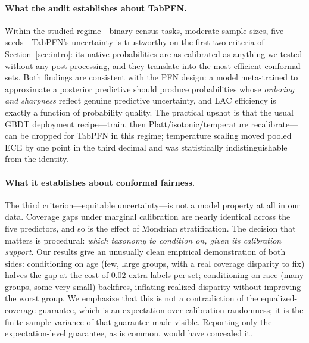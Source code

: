 \documentclass[review,12pt]{elsarticle}
\begin{document}
\paragraph{What the audit establishes about TabPFN.}
Within the studied regime---binary census tasks, moderate sample sizes, five seeds---TabPFN's uncertainty is trustworthy on the first two criteria of Section~\ref{sec:intro}: its native probabilities are as calibrated as anything we tested without any post-processing, and they translate into the most efficient conformal sets. Both findings are consistent with the PFN design: a model meta-trained to approximate a posterior predictive should produce probabilities whose \emph{ordering and sharpness} reflect genuine predictive uncertainty, and LAC efficiency is exactly a function of probability quality. The practical upshot is that the usual GBDT deployment recipe---train, then Platt/isotonic/temperature recalibrate---can be dropped for TabPFN in this regime; temperature scaling moved pooled ECE by one point in the third decimal and was statistically indistinguishable from the identity.

\paragraph{What it establishes about conformal fairness.}
The third criterion---equitable uncertainty---is not a model property at all in our data. Coverage gaps under marginal calibration are nearly identical across the five predictors, and so is the effect of Mondrian stratification. The decision that matters is procedural: \emph{which taxonomy to condition on, given its calibration support}. Our results give an unusually clean empirical demonstration of both sides: conditioning on age (few, large groups, with a real coverage disparity to fix) halves the gap at the cost of $0.02$ extra labels per set; conditioning on race (many groups, some very small) backfires, inflating realized disparity without improving the worst group. We emphasize that this is not a contradiction of the equalized-coverage guarantee, which is an expectation over calibration randomness; it is the finite-sample variance of that guarantee made visible. Reporting only the expectation-level guarantee, as is common, would have concealed it.
\end{document}

